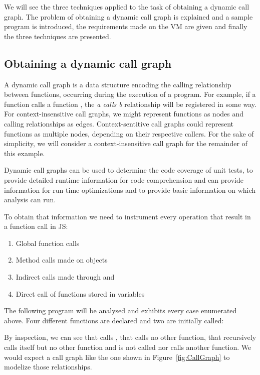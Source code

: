 We will see the three techniques applied to the task of obtaining a dynamic
call graph. The problem of obtaining a dynamic call graph is explained and a
sample program is introduced, the requirements made on the VM are given and
finally the three techniques are presented.

\subsection{Obtaining a dynamic call graph}

A dynamic call graph is a data structure encoding the calling relationship
between functions, occurring during the execution of a program. For example, if
a function  calls a function , the \textit{a calls b} relationship
will be registered in some way. For context-insensitive call graphs, we might
represent functions as nodes and calling relationships as edges.
Context-sentitive call graphs could represent functions as multiple nodes,
depending on their respective callers. For the sake of simplicity, we will
consider a context-insensitive call graph for the remainder of this example. 

Dynamic call graphs can be used to determine the code coverage of unit tests,
to provide detailed runtime information for code comprehension and can provide
information for run-time optimizations and to provide basic information on which
analysis can run.

To obtain that information we need to instrument every operation that result in
a function call in JS:
\begin{enumerate}
    \item Global function calls
    \item Method calls made on objects
    \item Indirect calls made through  and  
    \item Direct call of functions stored in variables
\end{enumerate}

The following program will be analysed and exhibits every case enumerated
above. Four different functions are declared and two are initially called:


By inspection, we can see that  calls , that  calls no other
function, that  recursively calls itself but no other function and 
is not called nor calls another function. We would expect a call graph like the
one shown in Figure~\ref{fig:CallGraph} to modelize those relationships.

